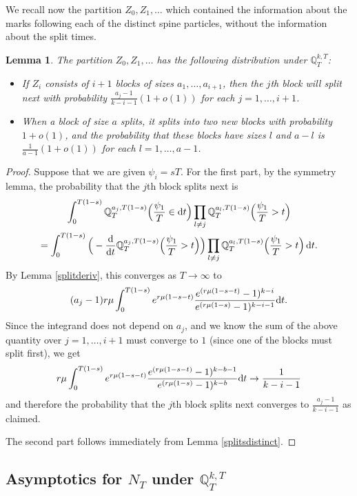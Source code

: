 \documentclass{article}
\theoremstyle{plain}
\newtheorem{lem}[thm]{Lemma}
\theoremstyle{definition}
\newcommand{\Q}{\mathbb{Q}}
\renewcommand{\d}{{\rm{d}}}
\begin{document}
We recall now the partition $Z_0,Z_1,\ldots$ which contained the information about the marks following each of the distinct spine particles, without the information about the split times.

\begin{lem}\label{Qtopology}
The partition $Z_0,Z_1,\ldots$ has the following distribution under $\Q^{k,T}_T$:
\begin{itemize}
\item If $Z_i$ consists of $i+1$ blocks of sizes $a_1,\ldots,a_{i+1}$, then the $j$th block will split next with probability $\frac{a_j-1}{k-i-1}(1+o(1))$ for each $j=1,\ldots,i+1$.
\item When a block of size $a$ splits, it splits into two new blocks with probability $1+o(1)$, and the probability that these blocks have sizes $l$ and $a-l$ is $\frac{1}{a-1}(1+o(1))$ for each $l=1,\ldots,a-1$.
\end{itemize}
\end{lem}

\begin{proof}
Suppose that we are given $\psi_{i}=sT$. For the first part, by the symmetry lemma, the probability that the $j$th block splits next is
\begin{multline*}
\int_0^{T(1-s)} \Q^{a_j,T(1-s)}_T\Big(\frac{\psi_1}{T}\in\d t\Big) \prod_{l\neq j} \Q^{a_l,T(1-s)}_T\Big(\frac{\psi_1}{T} > t\Big)\\
= \int_0^{T(1-s)}\Big(-\frac{\d}{\d t} \Q^{a_j,T(1-s)}_T\Big(\frac{\psi_1}{T}>t\Big)\Big) \prod_{l\neq j} \Q^{a_l,T(1-s)}_T\Big(\frac{\psi_1}{T} > t\Big)\,\d t.
\end{multline*}
By Lemma \ref{splitderiv}, this converges as $T\to\infty$ to
\[(a_j-1)r\mu\int_0^{T(1-s)} e^{r\mu (1-s-t)} \frac{e^{(r\mu(1-s-t)}-1)^{k-i}}{e^{(r\mu(1-s)}-1)^{k-i-1}} \d t.\]
Since the integrand does not depend on $a_j$, and we know the sum of the above quantity over $j=1,\ldots,i+1$ must converge to $1$ (since one of the blocks must split first), we get
\[r\mu\int_0^{T(1-s)} e^{r\mu (1-s-t)} \frac{e^{(r\mu(1-s-t)}-1)^{k-b-1}}{e^{(r\mu(1-s)}-1)^{k-b}} \d t \to \frac{1}{k-i-1}\]
and therefore the probability that the $j$th block splits next converges to $\frac{a_j-1}{k-i-1}$ as claimed.

The second part follows immediately from Lemma \ref{splitsdistinct}.
\end{proof}




\subsection{Asymptotics for $N_T$ under $\Q^{k,T}_T$}
\end{document}
